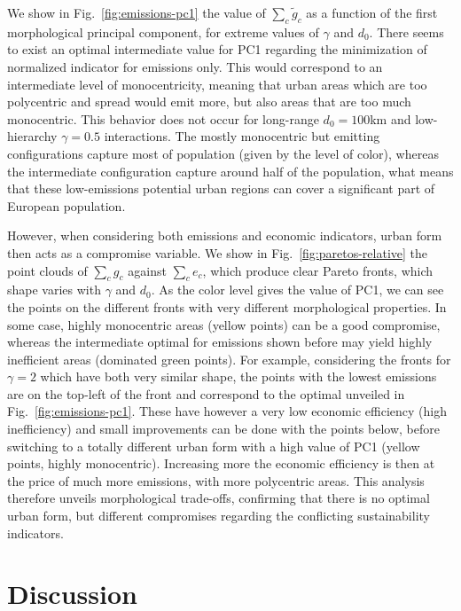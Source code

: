 \documentclass{jimis-en}
\begin{document}
We show in Fig.~\ref{fig:emissions-pc1} the value of $\sum_c \tilde{g}_c$ as a function of the first morphological principal component, for extreme values of $\gamma$ and $d_0$. There seems to exist an optimal intermediate value for PC1 regarding the minimization of normalized indicator for emissions only. This would correspond to an intermediate level of monocentricity, meaning that urban areas which are too polycentric and spread would emit more, but also areas that are too much monocentric. This behavior does not occur for long-range $d_0 = 100$km and low-hierarchy $\gamma=0.5$ interactions. The mostly monocentric but emitting configurations capture most of population (given by the level of color), whereas the intermediate configuration capture around half of the population, what means that these low-emissions potential urban regions can cover a significant part of European population.


However, when considering both emissions and economic indicators, urban form then acts as a compromise variable. We show in Fig.~\ref{fig:paretos-relative} the point clouds of $\sum_c g_c$ against $\sum_c e_c$, which produce clear Pareto fronts, which shape varies with $\gamma$ and $d_0$. As the color level gives the value of PC1, we can see the points on the different fronts with very different morphological properties. In some case, highly monocentric areas (yellow points) can be a good compromise, whereas the intermediate optimal for emissions shown before may yield highly inefficient areas (dominated green points). For example, considering the fronts for $\gamma = 2$ which have both very similar shape, the points with the lowest emissions are on the top-left of the front and correspond to the optimal unveiled in Fig.~\ref{fig:emissions-pc1}. These have however a very low economic efficiency (high inefficiency) and small improvements can be done with the points below, before switching to a totally different urban form with a high value of PC1 (yellow points, highly monocentric). Increasing more the economic efficiency is then at the price of much more emissions, with more polycentric areas. This analysis therefore unveils morphological trade-offs, confirming that there is no optimal urban form, but different compromises regarding the conflicting sustainability indicators.



\section{Discussion}
\end{document}
